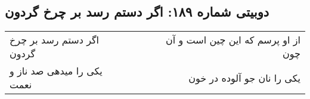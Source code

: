 \begin{center}
\section*{دوبیتی شماره ۱۸۹: اگر دستم رسد بر چرخ گردون}
\label{sec:189}
\begin{longtable}{l p{0.5cm} r}
اگر دستم رسد بر چرخ گردون
&&
از او پرسم که این چین است و آن چون
\\
یکی را میدهی صد ناز و نعمت
&&
یکی را نان جو آلوده در خون
\\
\end{longtable}
\end{center}
